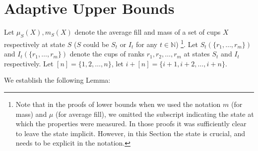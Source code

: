 \documentclass[twocolumn]{article}[11pt]
\begin{document}
\section{Adaptive Upper Bounds}\label{sec:adaptiveUpperBound}

Let $\mu_S(X), m_S(X)$ denote the average fill and mass of a set of cups $X$
respectively at state $S$ ($S$ could be $S_t$ or $I_t$ for any $t\in\mathbb{N}$)
\footnote{Note that in the proofs of lower bounds when we used the notation $m$
  (for mass) and $\mu$ (for average fill), we omitted the subscript
  indicating the state at which the properties were measured. 
  In those proofs it was sufficiently clear to leave the state implicit.
  However, in this Section the state is crucial, and needs to be explicit in the notation.}.
Let $S_t(\{r_1, \ldots, r_m\})$ and $I_t(\{r_1,\ldots, r_m\})$ denote the cups
of ranks $r_1, r_2, \ldots, r_m$ at states $S_t$ and $I_t$ respectively.
Let $[n] = \{1,2,\ldots, n\}$, let $i+[n] = \{i+1, i+2, \ldots, i+n\}$.

We establish the following Lemma:
\end{document}
